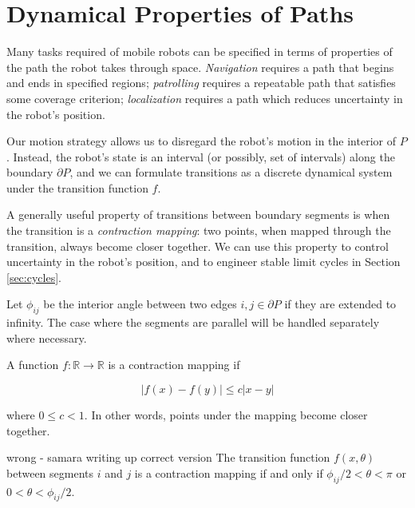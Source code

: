 \documentclass[]{svproc}  %
\begin{document}
\section{Dynamical Properties of Paths}

Many tasks required of mobile robots can be specified in terms of properties of
the path the robot takes through space. \emph{Navigation} requires a path that
begins and ends in specified regions; \emph{patrolling} requires a repeatable
path that satisfies some coverage criterion; \emph{localization} requires a path
which reduces uncertainty in the robot's position.

Our motion strategy allows us to disregard the robot's motion in the interior of
$P$. Instead, the robot's state is an interval (or possibly, set of intervals)
along the boundary $\partial P$, and we can formulate transitions as a discrete
dynamical system under the transition function $f$. 

A generally useful property of transitions between boundary segments is when the
transition is a \emph{contraction mapping}: two points, when mapped through the
transition, always become closer together. We can use this property to control
uncertainty in the robot's position, and to engineer stable limit cycles in
Section \ref{sec:cycles}.

\begin{definition}
Let $\phi_{ij}$ be the interior angle between two edges $i, j \in \partial P$ if
they are extended to infinity. The case where the segments are parallel will be
handled separately where necessary. 
\end{definition}

\begin{definition}

A function $f: \mathbb{R} \to \mathbb{R}$ is a contraction mapping if

\begin{equation*}
|f(x) - f(y)| \leq c |x-y|
\end{equation*}

where $0 \leq c < 1$. In other words, points under the mapping become closer
together.
\end{definition}

\begin{lemma} \label{lemma:angrange}
{\color{red} wrong - samara writing up correct version}
The transition function $f(x, \theta)$ between
 segments $i$ and $j$ is a contraction mapping if and only if $\phi_{ij}/2 < \theta < \pi$ or $0 < \theta
< \phi_{ij}/2$.
\end{lemma}
\end{document}
